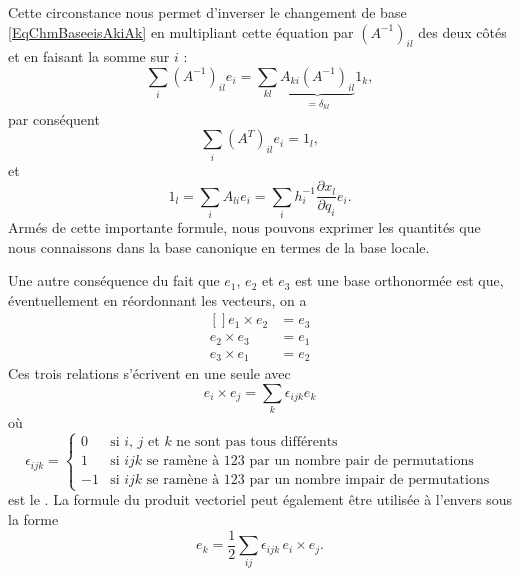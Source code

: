 Cette circonstance nous permet d'inverser le changement de base \eqref{EqChmBaseeisAkiAk} en multipliant cette équation par $(A^{-1})_{il}$ des deux côtés et en faisant la somme sur $i$ :
\begin{equation}
    \sum_i (A^{-1})_{il}e_i=\sum_{kl}\underbrace{A_{ki}(A^{-1})_{il}}_{=\delta_{kl}}1_k,
\end{equation}
par conséquent
\begin{equation}
    \sum_i(A^T)_{il}e_i=1_l,    
\end{equation}
et
\begin{equation}        \label{EqChamvarunlAei}
    1_l=\sum_iA_{li}e_i=\sum_ih_i^{-1}\frac{ \partial x_l }{ \partial q_i }e_i.
\end{equation}
Armés de cette importante formule, nous pouvons exprimer les quantités que nous connaissons dans la base canonique en termes de la base locale.

Une autre conséquence du fait que $e_1$, $e_2$ et $e_3$ est une base orthonormée est que, éventuellement en réordonnant les vecteurs, on a
\begin{equation}
    \begin{aligned}[]
        e_1\times e_2&=e_3\\
        e_2\times e_3&=e_1\\
        e_3\times e_1&=e_2
    \end{aligned}
\end{equation}
Ces trois relations s'écrivent en une seule avec
\begin{equation}
    e_i\times e_j=\sum_{k}\epsilon_{ijk}e_k
\end{equation}
où 
\begin{equation}
    \epsilon_{ijk}=\begin{cases}
        0    &   \text{si $i$, $j$ et $k$ ne sont pas tous différents}\\
        1    &    \text{si $ijk$ se ramène à $123$ par un nombre pair de permutations}\\
        -1    &    \text{si $ijk$ se ramène à $123$ par un nombre impair de permutations}
    \end{cases}
\end{equation}
est le . La formule du produit vectoriel peut également être utilisée à l'envers sous la forme
\begin{equation}        \label{Eqekeitimesej}
    e_k=\frac{ 1 }{2}\sum_{ij}\epsilon_{ijk}\,e_i\times e_j.
\end{equation}

